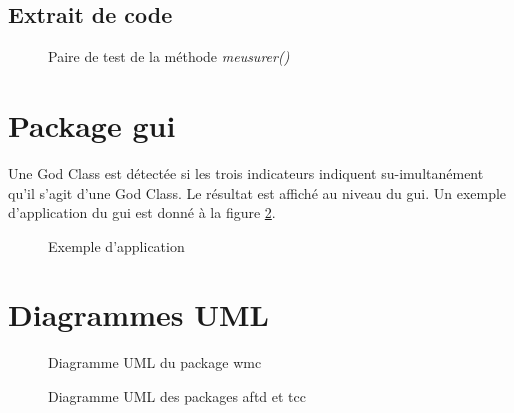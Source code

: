 \documentclass[11pt]{report}
\begin{document}
		\newpage 
		\subsection{Extrait de code}
		\begin{figure}[h]
			\centering
			\caption{Paire de test de la méthode \textit{meusurer()}}
			\label{aftd}
		\end{figure}
			
			
	\newpage	
	\section{Package gui}
		Une God Class est détectée si les trois indicateurs indiquent su-imultanément qu'il s'agit d'une God Class. Le résultat est affiché au niveau du gui. Un exemple d'application du gui est donné à la figure \ref{gui}.
		\begin{figure}[h]
			\centering
			\caption{Exemple d'application}
			\label{gui}
		\end{figure}
	
		
	\section{Diagrammes UML}\label{uml}
		
		\begin{figure}[h]
			\centering
			\caption{Diagramme UML du package wmc}
			\label{uml1}
		\end{figure}
		
		\begin{figure}[h]
			\centering
			\caption{Diagramme UML des packages aftd et tcc}
			\label{uml2}
		\end{figure}
		
\end{document}
